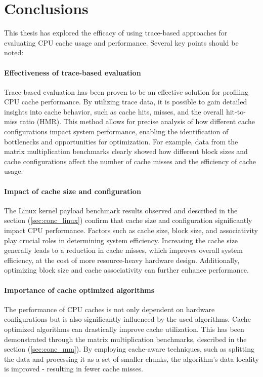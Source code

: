 
\chapter{Conclusions}

This thesis has explored the efficacy of using trace-based approaches for evaluating CPU cache usage and performance. Several key points should be noted:

\subsubsection*{Effectiveness of trace-based evaluation}

Trace-based evaluation has been proven to be an effective solution for profiling CPU cache performance.
By utilizing trace data, it is possible to gain detailed insights into cache behavior, such as cache hits, misses, and the overall hit-to-miss ratio (HMR). This method allows
for precise analysis of how different cache configurations impact system performance, enabling the identification of bottlenecks and opportunities for optimization.
For example, data from the matrix multiplication benchmarks clearly showed how different block sizes and cache configurations affect the number of cache misses and the
efficiency of cache usage.

\subsubsection*{Impact of cache size and configuration}

The Linux kernel payload benchmark results observed and described in the section (\ref{sec:conc_linux}) confirm that cache size and configuration significantly impact CPU
performance. Factors such as cache size, block size, and associativity play crucial roles in determining system efficiency. Increasing the cache size generally leads to a reduction
in cache misses, which improves overall system efficiency, at the cost of more resource-heavy hardware design. Additionally, optimizing block size and cache associativity can
further enhance performance.

\subsubsection*{Importance of cache optimized algorithms}

The performance of CPU caches is not only dependent on hardware configurations but is also significantly influenced by the used algorithms. Cache optimized algorithms can
drastically improve cache utilization. This has been demonstrated through the matrix multiplication benchmarks, described in the section (\ref{sec:conc_mm}). By employing
cache-aware techniques, such as splitting the data and processing it as a set of smaller chunks, the algorithm's data locality is improved - resulting in fewer cache misses.

